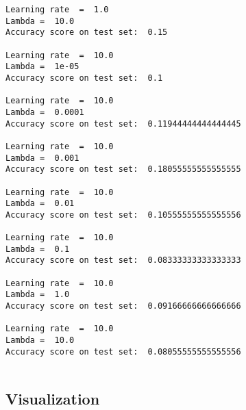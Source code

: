 \documentclass[11pt]{article}
\begin{document}
\begin{Verbatim}[commandchars=\\\{\}]
Learning rate  =  1.0
Lambda =  10.0
Accuracy score on test set:  0.15

Learning rate  =  10.0
Lambda =  1e-05
Accuracy score on test set:  0.1

Learning rate  =  10.0
Lambda =  0.0001
Accuracy score on test set:  0.11944444444444445

Learning rate  =  10.0
Lambda =  0.001
Accuracy score on test set:  0.18055555555555555

Learning rate  =  10.0
Lambda =  0.01
Accuracy score on test set:  0.10555555555555556

Learning rate  =  10.0
Lambda =  0.1
Accuracy score on test set:  0.08333333333333333

Learning rate  =  10.0
Lambda =  1.0
Accuracy score on test set:  0.09166666666666666

Learning rate  =  10.0
Lambda =  10.0
Accuracy score on test set:  0.08055555555555556


    \end{Verbatim}

    \hypertarget{visualization}{%
\subsection{Visualization}\label{visualization}}
\end{document}
